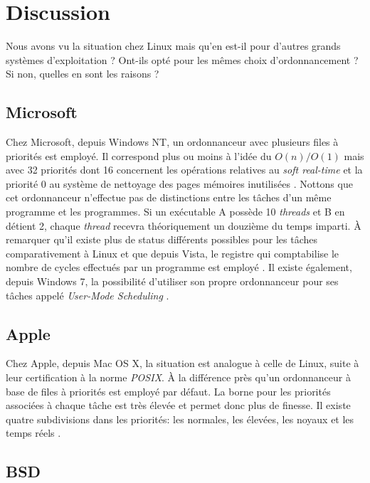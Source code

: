 \documentclass[letterpaper]{article}
\begin{document}
\section{Discussion}

Nous avons vu la situation chez Linux mais qu'en est-il pour d'autres grands systèmes d'exploitation ? Ont-ils opté pour les mêmes choix d'ordonnancement ? Si non, quelles en sont les raisons ?

\subsection{Microsoft}

Chez Microsoft, depuis Windows NT, un ordonnanceur avec plusieurs files à priorités est employé. Il correspond plus ou moins à l'idée du $O(n) / O(1)$ mais avec 32 priorités dont 16 concernent les opérations relatives au \textit{soft real-time} et la priorité 0 au système de nettoyage des pages mémoires inutilisées \citep{jones1999cpu}. Nottons que cet ordonnanceur n'effectue pas de distinctions entre les tâches d'un même programme et les programmes. Si un exécutable A possède 10 \textit{threads} et B en détient 2, chaque \textit{thread} recevra théoriquement un douzième du temps imparti. À remarquer qu'il existe plus de status différents possibles pour les tâches comparativement à Linux et que depuis Vista, le registre qui comptabilise le nombre de cycles effectués par un programme est employé \citep{Russinovich:2009:WII:1717352}. Il existe également, depuis Windows 7, la possibilité d'utiliser son propre ordonnanceur pour ses tâches appelé \textit{User-Mode Scheduling} \citep{UMS}.

\subsection{Apple}

Chez Apple, depuis Mac OS X, la situation est analogue à celle de Linux, suite à leur certification à la norme \textit{POSIX}. À la différence près qu'un ordonnanceur à base de files à priorités est employé par défaut. La borne pour les priorités associées à chaque tâche est très élevée et permet donc plus de finesse. Il existe quatre subdivisions dans les priorités: les normales, les élevées, les noyaux et les temps réels \citep{singh2006mac}.

\subsection{BSD}
\end{document}
